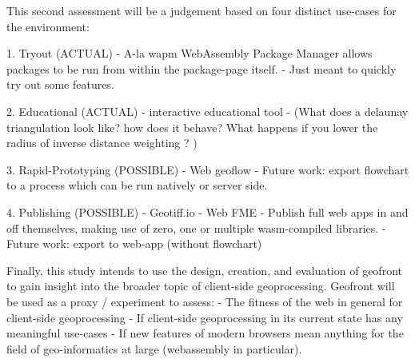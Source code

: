 This second assessment will be a judgement based on four distinct use-cases for the environment:

1. Tryout (ACTUAL)
   - A-la wapm WebAssembly Package Manager allows packages to be run from within the package-page itself. 
  - Just meant to quickly try out some features.

2. Educational (ACTUAL)
   - interactive educational tool
   - (What does a delaunay triangulation look like? how does it behave? What happens if you lower the radius of inverse distance weighting ? )

3. Rapid-Prototyping (POSSIBLE)
   - Web geoflow
   - Future work: export flowchart to a process which can be run natively or server side.

4. Publishing (POSSIBLE)
   - Geotiff.io
   - Web FME 
   - Publish full web apps in and off themselves, making use of zero, one or multiple wasm-compiled libraries.  
   - Future work: export to web-app (without flowchart)


Finally, this study intends to use the design, creation, and evaluation of geofront to gain insight into the broader topic of client-side geoprocessing. 
Geofront will be used as a proxy / experiment to assess: 
- The fitness of the web in general for client-side geoprocessing
- If client-side geoprocessing in its current state has any meaningful use-cases
- If new features of modern browsers mean anything for the field of geo-informatics at large (webassembly in particular). 










